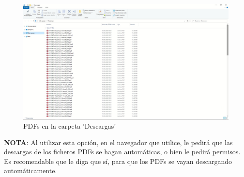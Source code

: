 \documentclass{article}
\begin{document}
\begin{figure}[H]
	\centering
	\includegraphics[width=0.8\linewidth]{pdfs.jpg}
	\caption{PDFs en la carpeta 'Descargas'}
	\label{fig:pdfs}
\end{figure}

\textbf{NOTA}: Al utilizar esta opción, en el navegador que utilice, le pedirá que las descargas de los ficheros PDFs se hagan automáticas, o bien le pedirá permisos. Es recomendable que le diga que sí, para que los PDFs se vayan descargando automáticamente.
\end{document}
